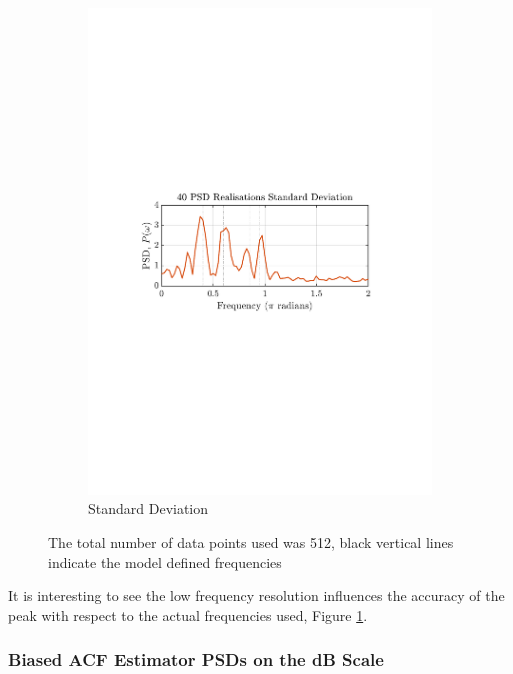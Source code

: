 \documentclass[12pt]{article}
\begin{document}
\begin{figure}[H]
\begin{subfigure}{0.49\textwidth}
			\includegraphics[trim={2.2cm 11.2cm 3.15cm  11.2cm}, clip, width=\textwidth]{../MATLAB/figures/q1_3b_fig02.pdf} 
			\captionsetup{justification=centering}
			\caption{Standard Deviation}
		\end{subfigure}
		\captionsetup{justification=centering}
		\caption{The total number of data points used was 512, black vertical lines indicate the model defined frequencies}
		\label{fig: 1-3b}
	\end{figure}

	It is interesting to see the low frequency resolution influences the accuracy of the peak with respect to the actual frequencies used, Figure \ref{fig: 1-3b}.

	\subsubsection{Biased ACF Estimator PSDs on the dB Scale}
\end{document}
